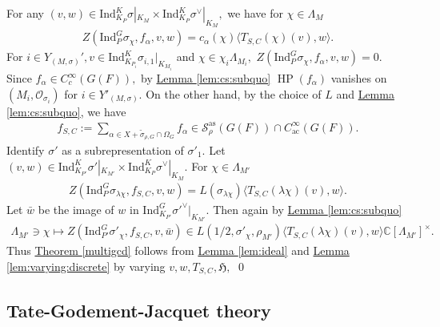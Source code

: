 \documentclass[10pt]{amsart}
\theoremstyle{definition}
\numberwithin{equation}{section}
\numberwithin{equation}{subsection}
\newcommand{\Ind}{\mathrm{Ind}}
\newcommand{\ZZ}{\mathbb{Z}}
\newcommand{\CC}{\mathbb{C}}
\newcommand{\HP}{\mathop{\mathrm{HP}}\nolimits}
\begin{document}
For any $(v,w)\in \Ind_{K_{P}}^K \sigma|_{K_{M}}\times \Ind_{K_{P}}^K \sigma^\lor|_{K_{M}},$ we have for $\chi\in \Lambda_M$
    \begin{align*}
        Z(\mathrm{\Ind}_{P}^G \sigma_{\chi},f_\alpha,v,w)=c_{\alpha}(\chi)\langle T_{S,C}(\chi)(v),w\rangle.
    \end{align*}
    For $i\in Y_{(M,\sigma)}', v\in \mathrm{Ind}_{K_{P_i}}^K \sigma_{i,1}|_{K_{M_i}}$ and $\chi\in \chi_i\Lambda_{M_i},$ $ Z(\mathrm{\Ind}_{P}^G \sigma_{\chi},f_\alpha,v,w)=0$. Since $f_\alpha\in C^\infty_c(G(F)),$  by  \hyperref[lem:cs:subquo]{Lemma \ref{lem:cs:subquo}} $\HP(f_\alpha)$ vanishes on $(M_i,\mathcal{O}_{\sigma_i})$ for $i\in Y'_{(M,\sigma)}$. On the other hand, by the choice of $L$ and \hyperref[lem:cs:subquo]{Lemma \ref{lem:cs:subquo}}, we have
\begin{align*}
    f_{S,C}:=\sum_{\alpha\in X+\widetilde{\sigma}_{\rho,G}\cap \Omega_G} f_\alpha\in \mathcal{S}^{\mathrm{as}}_\rho(G(F))\cap C^\infty_{\mathrm{ac}}(G(F)).
\end{align*}
Identify $\sigma'$ as a subrepresentation of $\sigma'_1$. Let $(v,w)\in \mathrm{Ind}_{K_{P'}}^K  \sigma'|_{K_{M'}}\times \mathrm{Ind}_{K_{P}}^K \sigma^\lor|_{K_{M}}.$ For $\chi\in \Lambda_{M'}$
\begin{align*}
    Z(\mathrm{Ind}_P^G \sigma_{\lambda\chi},f_{S,C},v,w)= L(\sigma_{\lambda\chi})\langle T_{S,C}(\lambda\chi)(v),w\rangle.
\end{align*}
Let $\bar{w}$ be the image of $w$ in $\mathrm{Ind}_{K_{P'}}^G \sigma'^\lor|_{K_{M'}}.$ Then again by \hyperref[lem:cs:subquo]{Lemma \ref{lem:cs:subquo}}
\begin{align*}
    \Lambda_{M'}\ni\chi \mapsto Z(\mathrm{Ind}_{P'}^G\sigma'_\chi,f_{S,C},v,\bar{w})\in L(1/2,\sigma'_\chi,\rho_{M'})\langle T_{S,C}(\lambda\chi)(v),w\rangle\CC[\Lambda_{M'}]^\times.
\end{align*}
 Thus \hyperref[multigcd]{Theorem \ref{multigcd}} follows from \hyperref[lem:ideal]{Lemma \ref{lem:ideal}} and \hyperref[lem:varying:discrete]{Lemma \ref{lem:varying:discrete}} by varying $v,w, T_{S,C}, \mathfrak{H},$
\qed

\subsection{Tate-Godement-Jacquet theory}\label{ssec:Tate}

\end{document}
